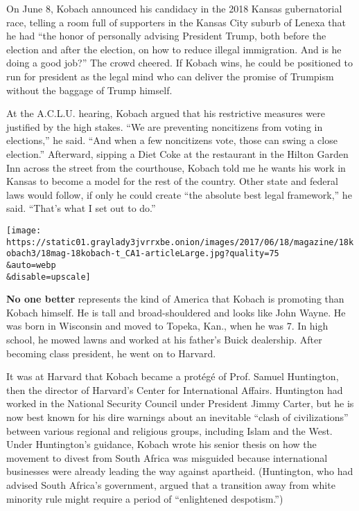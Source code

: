 On June 8, Kobach announced his candidacy in the 2018 Kansas
gubernatorial race, telling a room full of supporters in the Kansas City
suburb of Lenexa that he had ``the honor of personally advising
President Trump, both before the election and after the election, on how
to reduce illegal immigration. And is he doing a good job?'' The crowd
cheered. If Kobach wins, he could be positioned to run for president as
the legal mind who can deliver the promise of Trumpism without the
baggage of Trump himself.

At the A.C.L.U. hearing, Kobach argued that his restrictive measures
were justified by the high stakes. ``We are preventing noncitizens from
voting in elections,'' he said. ``And when a few noncitizens vote, those
can swing a close election.'' Afterward, sipping a Diet Coke at the
restaurant in the Hilton Garden Inn across the street from the
courthouse, Kobach told me he wants his work in Kansas to become a model
for the rest of the country. Other state and federal laws would follow,
if only he could create ``the absolute best legal framework,'' he said.
``That's what I set out to do.''

\texttt{[image: https://static01.graylady3jvrrxbe.onion/images/2017/06/18/magazine/18kobach3/18mag-18kobach-t\_CA1-articleLarge.jpg?quality=75\\\&auto=webp\\\&disable=upscale]}

\textbf{No one better} represents the kind of America that Kobach is
promoting than Kobach himself. He is tall and broad-shouldered and looks
like John Wayne. He was born in Wisconsin and moved to Topeka, Kan.,
when he was 7. In high school, he mowed lawns and worked at his father's
Buick dealership. After becoming class president, he went on to Harvard.

It was at Harvard that Kobach became a protégé of Prof. Samuel
Huntington, then the director of Harvard's Center for International
Affairs. Huntington had worked in the National Security Council under
President Jimmy Carter, but he is now best known for his dire warnings
about an inevitable ``clash of civilizations'' between various regional
and religious groups, including Islam and the West. Under Huntington's
guidance, Kobach wrote his senior thesis on how the movement to divest
from South Africa was misguided because international businesses were
already leading the way against apartheid. (Huntington, who had advised
South Africa's government, argued that a transition away from white
minority rule might require a period of ``enlightened despotism.'')

